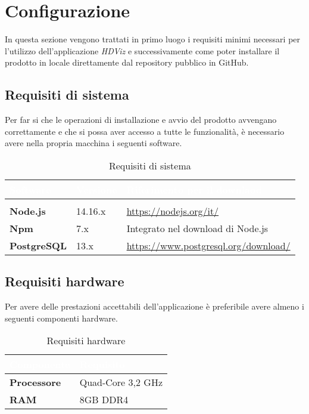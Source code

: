\section{Configurazione}
In questa sezione vengono trattati in primo luogo i requisiti minimi necessari per l'utilizzo dell'applicazione \textit{HDViz} e successivamente come poter installare il prodotto in locale direttamente dal repository pubblico in GitHub.  
\subsection{Requisiti di sistema}
Per far si che le operazioni di installazione e avvio del prodotto avvengano correttamente e che si possa aver accesso a tutte le funzionalità, è necessario avere nella propria macchina i seguenti software.
{
\setlength\arrayrulewidth{0.95pt}
\renewcommand{\arraystretch}{1.5}
\begin{longtable}{C{3cm} C{3cm} C{9cm}}

\textcolor{white}{\textbf{Software}}&
\textcolor{white}{\textbf{Versione}}&
\textcolor{white}{\textbf{Riferimento per il downlaod}} \\
\endfirsthead
{}\\
\endfoot
{}\caption{Requisiti di sistema}
\endlastfoot
	
	\textbf{Node.js} &
	14.16.x &
	\textcolor{blue}{\url{https://nodejs.org/it/}} \\
 
	\textbf{Npm} & 
	7.x &
	Integrato nel download di Node.js \\
	
	\textbf{PostgreSQL} &
	13.x &
	\textcolor{blue}{\url{https://www.postgresql.org/download/}} \\
\end{longtable}	

}
\subsection{Requisiti hardware}
Per avere delle prestazioni accettabili dell'applicazione è preferibile avere almeno i seguenti componenti hardware.
{
\setlength\arrayrulewidth{0.95pt}
\renewcommand{\arraystretch}{1.5}
\begin{longtable}{C{4cm} C{4cm}}

\textcolor{white}{\textbf{Componente}}&
\textcolor{white}{\textbf{Requisito}} \\
\endfirsthead
\endfoot
{}\caption{Requisiti hardware}
\endlastfoot
	
	\textbf{Processore} &
	 Quad-Core 3,2 GHz \\
 
	\textbf{RAM} & 
	8GB DDR4 \\

\end{longtable}	
}

